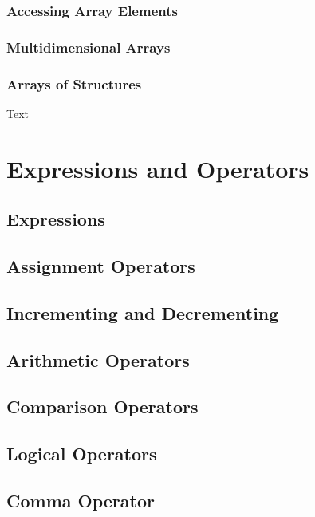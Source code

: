 \documentclass{article}
\begin{document}
\subsubsection{Accessing Array Elements}

\subsubsection{Multidimensional Arrays}

\subsubsection{Arrays of Structures}
Text

\section{Expressions and Operators}

\subsection{Expressions}

\subsection{Assignment Operators}

\subsection{Incrementing and Decrementing}

\subsection{Arithmetic Operators}

\subsection{Comparison Operators}

\subsection{Logical Operators}

\subsection{Comma Operator}
\end{document}
